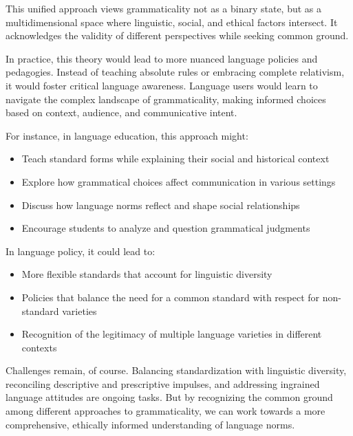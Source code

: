 This unified approach views grammaticality not as a binary state, but as a multidimensional space where linguistic, social, and ethical factors intersect. It acknowledges the validity of different perspectives while seeking common ground.

In practice, this theory would lead to more nuanced language policies and pedagogies. Instead of teaching absolute rules or embracing complete relativism, it would foster critical language awareness. Language users would learn to navigate the complex landscape of grammaticality, making informed choices based on context, audience, and communicative intent.

For instance, in language education, this approach might:

\begin{itemize}
    \item Teach standard forms while explaining their social and historical context
    \item Explore how grammatical choices affect communication in various settings
    \item Discuss how language norms reflect and shape social relationships
    \item Encourage students to analyze and question grammatical judgments
\end{itemize}

In language policy, it could lead to:

\begin{itemize}
    \item More flexible standards that account for linguistic diversity
    \item Policies that balance the need for a common standard with respect for non-standard varieties
    \item Recognition of the legitimacy of multiple language varieties in different contexts
\end{itemize}

Challenges remain, of course. Balancing standardization with linguistic diversity, reconciling descriptive and prescriptive impulses, and addressing ingrained language attitudes are ongoing tasks. But by recognizing the common ground among different approaches to grammaticality, we can work towards a more comprehensive, ethically informed understanding of language norms.

